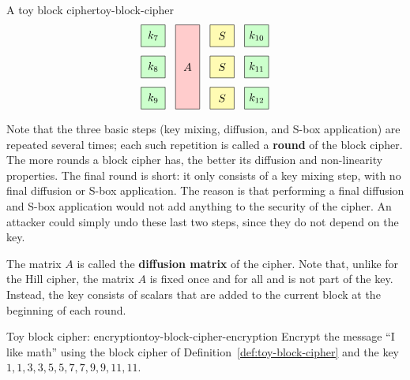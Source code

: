 \documentclass{ximera}
\begin{document}
\begin{definition}{A toy block cipher}{toy-block-cipher}
\begin{equation*}
\begin{tikzpicture}[xscale=1.1,
      a/.style={fill=red!20},
      s/.style={fill=yellow!30},
      k/.style={fill=green!20}]
      \draw[k] (7,2) +(-0.35,-0.35) rectangle node{$k_7$} +(0.35,0.35);
      \draw[k] (7,1) +(-0.35,-0.35) rectangle node{$k_8$} +(0.35,0.35);
      \draw[k] (7,0) +(-0.35,-0.35) rectangle node{$k_9$} +(0.35,0.35);
      \draw[a] (8,0) +(-0.35,-0.35) rectangle node{$A$} +(0.35,2.35);
      \draw[s] (9,2) +(-0.35,-0.35) rectangle node{$S$} +(0.35,0.35);
      \draw[s] (9,1) +(-0.35,-0.35) rectangle node{$S$} +(0.35,0.35);
      \draw[s] (9,0) +(-0.35,-0.35) rectangle node{$S$} +(0.35,0.35);
      \draw[k] (10,2) +(-0.35,-0.35) rectangle node{$k_{10}$} +(0.35,0.35);
      \draw[k] (10,1) +(-0.35,-0.35) rectangle node{$k_{11}$} +(0.35,0.35);
      \draw[k] (10,0) +(-0.35,-0.35) rectangle node{$k_{12}$} +(0.35,0.35);
  \end{tikzpicture}
\end{equation*}
\end{definition}

Note that the three basic steps (key mixing, diffusion, and S-box
application) are repeated several times; each such repetition is
called a \textbf{round}%
%
 of the block cipher.  The more rounds a
block cipher has, the better its diffusion and non-linearity
properties. The final round is short: it only consists of a key
mixing step, with no final diffusion or S-box application. The reason
is that performing a final diffusion and S-box application would not
add anything to the security of the cipher. An attacker could simply
undo these last two steps, since they do not depend on the key.

The matrix $A$ is called the \textbf{diffusion matrix}%
%
%
 of the cipher. Note that, unlike for
the Hill cipher, the matrix $A$ is fixed once and for all and is not
part of the key. Instead, the key consists of scalars that are added
to the current block at the beginning of each round.

\begin{example}{Toy block cipher: encryption}{toy-block-cipher-encryption}
  Encrypt the message ``I like math'' using the block cipher of
  Definition~\ref{def:toy-block-cipher} and the key
  $1,1,3,3,5,5,7,7,9,9,11,11$.
\end{example}
\end{document}
